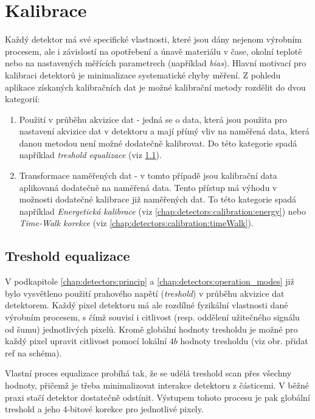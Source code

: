 \section{Kalibrace}\label{chap:detectors:calibration}
Každý detektor má své specifické vlastnosti, které jsou dány nejenom výrobním procesem, ale i závislostí na opotřebení a únavě materiálu v čase, okolní teplotě nebo na nastavených měřících parametrech (například \textit{bias}). Hlavní motivací pro kalibraci detektorů je minimalizace systematické chyby měření. Z pohledu aplikace získaných kalibračních dat je možné kalibrační metody rozdělit do dvou kategorií:
\begin{enumerate}[label=(\roman*)]
	\item Použití v průběhu akvizice dat - jedná se o data, která jsou použita pro nastavení akvizice dat v detektoru a mají přímý vliv na naměřená data, která danou metodou není možné dodatečně kalibrovat. Do této kategorie spadá například \textit{treshold equalizace} (viz \ref{chap:detectors:calibration:equalization}).
	\item Transformace naměřených dat - v tomto případě jsou kalibrační data aplikovaná dodatečně na naměřená data. Tento přístup má výhodu v možnosti dodatečné kalibrace již naměřených dat. To této kategorie spadá například \textit{Energetická kalibrace} (viz \ref{chap:detectors:calibration:energy}) nebo \textit{Time-Walk korekce} (viz \ref{chap:detectors:calibration:timeWalk}).
\end{enumerate}

\subsection{Treshold equalizace}\label{chap:detectors:calibration:equalization}
V podkapitole \ref{chap:detectors:princip} a \ref{chap:detectors:operation_modes} již bylo vysvětleno použití prahového napětí (\textit{treshold}) v průběhu akvizice dat detektorem. Každý pixel detektoru má ale rozdílné fyzikální vlastnosti dané výrobním procesem, s čímž souvisí i citlivost (resp. oddělení užitečného signálu od šumu) jednotlivých pixelů. Kromě globální hodnoty tresholdu je možné pro každý pixel upravit citlivost pomocí lokální $4b$ hodnoty tresholdu (viz obr. \todo přidat ref na schéma). 

Vlastní proces equalizace probíhá tak, že se udělá treshold scan přes všechny hodnoty, přičemž je třeba minimalizovat interakce detektoru z částicemi. V běžné praxi stačí detektor dostatečně odstínit. Výstupem tohoto procesu je pak globální treshold a jeho 4-bitové korekce pro jednotlivé pixely.

